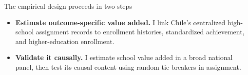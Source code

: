 \documentclass[11pt,aspectratio=169]{beamer}
\newenvironment{wideitemize}{%
  \begin{minipage}{0.92\textwidth}
  \begin{itemize}
  \addtolength{\itemsep}{0.85em}
}{%
  \end{itemize}
  \end{minipage}
}
\begin{document}

\begin{frame}{The empirical design proceeds in two steps}
\begin{wideitemize}
  \item \textbf{Estimate outcome-specific value added.} I link Chile's centralized high-school assignment records to enrollment histories, standardized achievement, and higher-education enrollment.

  \item \textbf{Validate it causally.} I estimate school value added in a broad national panel, then test its causal content using random tie-breakers in assignment.
\end{wideitemize}
\end{frame}
\end{document}
